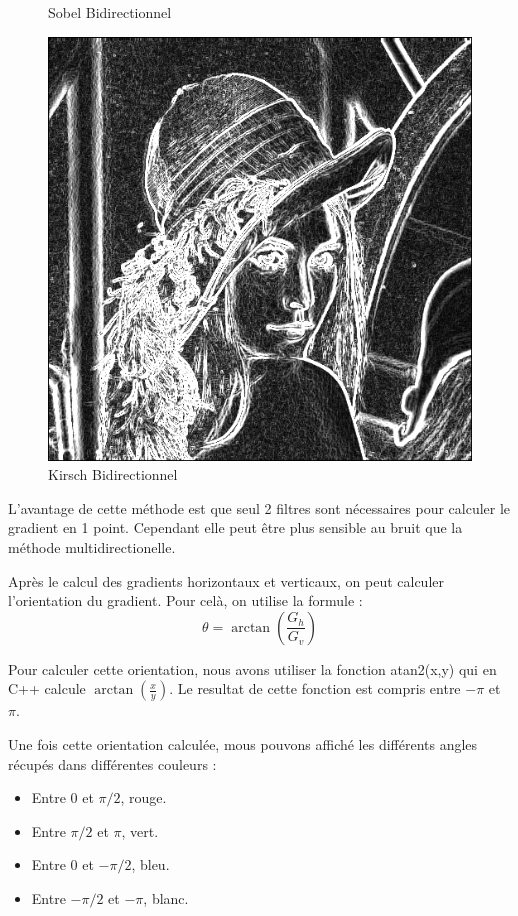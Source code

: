 \documentclass[11pt]{article}
\begin{document}
\begin{figure}[H]
\begin{minipage}[c]{.3\linewidth}
			\caption{Sobel Bidirectionnel}
			\label{fig:SobelBidirectionnel}
		\end{minipage}\hfill
		\begin{minipage}[c]{.3\linewidth}
		\centering
		\includegraphics[scale=0.25]{Image/filtreKirschBidirectionnel.png}
		\caption{Kirsch Bidirectionnel}
		\label{fig:KirschBidirectionnel}
		\end{minipage}
	\end{figure}

	L’avantage de cette méthode est que seul 2 filtres sont nécessaires pour calculer le gradient en 1 point. 
	Cependant elle peut être plus sensible au bruit que la méthode multidirectionelle.

	Après le calcul des gradients horizontaux et verticaux, on peut calculer l'orientation du gradient.
	Pour celà, on utilise la formule :
	$$
		\theta = \arctan(\frac{G_{h}}{G_{v}})
	$$

	Pour calculer cette orientation, nous avons utiliser la fonction atan2(x,y)	qui en C++ calcule $\arctan(\frac{x}{y})$. 
	Le resultat de cette fonction est compris entre $-\pi$ et $\pi$.

	Une fois cette orientation calculée, mous pouvons affiché les différents angles récupés dans différentes couleurs :
	\begin{itemize}
	\item Entre 0 et $\pi/2$, rouge.
	\item Entre $\pi/2$ et $\pi$, vert.
	\item Entre 0 et $-\pi/2$, bleu.
	\item Entre $-\pi/2$ et $-\pi$, blanc.
	\end{itemize}
            
\end{document}
